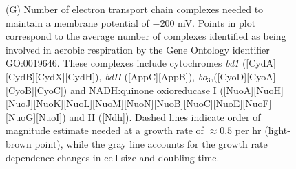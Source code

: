 \begin{figure}
\begin{fullwidth}
{{        (G) Number of electron transport chain complexes
            needed to maintain a membrane potential of $-$200 mV. Points in plot correspond
            to the average number of complexes identified as being involved in aerobic
            respiration by the Gene Ontology identifier GO:0019646. These complexes include
            cytochromes \textit{bd1} ([CydA][CydB][CydX][CydH]), \textit{bdII}
            ([AppC][AppB]), \textit{bo$_3$},([CyoD][CyoA][CyoB][CyoC]) and NADH:quinone
            oxioreducase I
            ([NuoA][NuoH][NuoJ][NuoK][NuoL][NuoM][NuoN][NuoB][NuoC][NuoE][NuoF][NuoG][NuoI])
            and II ([Ndh]). Dashed lines indicate order of magnitude estimate needed at a
            growth rate of $\approx 0.5 $ per hr (light-brown point), while the gray line
            accounts for the growth rate dependence changes in cell size and doubling time.}
    \label{fig:nutrient_cellwall_energy}
    }
  \end{fullwidth}
\end{figure}


%


